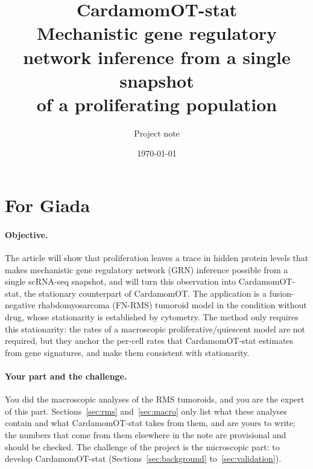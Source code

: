 \documentclass[a4paper, 11pt]{article}
\title{CardamomOT-stat\\[0.3em] \large Mechanistic gene regulatory network inference from a single snapshot\\ of a proliferating population}
\author{Project note}
\date{\today}
\theoremstyle{plain}
\theoremstyle{remark}
\begin{document}
\maketitle

\section*{For Giada}

\paragraph{Objective.} The article will show that proliferation leaves a trace in hidden protein levels that makes mechanistic gene regulatory network (GRN) inference possible from a single scRNA-seq snapshot, and will turn this observation into CardamomOT-stat, the stationary counterpart of CardamomOT. The application is a fusion-negative rhabdomyosarcoma (FN-RMS) tumoroid model in the condition without drug, whose stationarity is established by cytometry. The method only requires this stationarity: the rates of a macroscopic proliferative/quiescent model are not required, but they anchor the per-cell rates that CardamomOT-stat estimates from gene signatures, and make them consistent with stationarity.

\paragraph{Your part and the challenge.} You did the macroscopic analyses of the RMS tumoroids, and you are the expert of this part. Sections~\ref{sec:rms} and~\ref{sec:macro} only list what these analyses contain and what CardamomOT-stat takes from them, and are yours to write; the numbers that come from them elsewhere in the note are provisional and should be checked. The challenge of the project is the microscopic part: to develop CardamomOT-stat (Sections~\ref{sec:background} to~\ref{sec:validation}).
\end{document}
